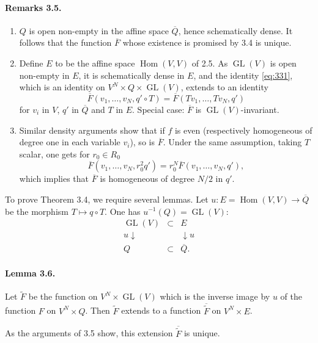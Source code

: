 \documentclass[11pt]{article}
\newcommand{\Hom}{\operatorname{Hom}}
\newcommand{\GL}{\operatorname{GL}}
\newcommand{\barQ}{\overline Q}
\begin{document}
\paragraph{Remarks 3.5.}
\begin{enumerate}[label=(\roman*)]
\item $Q$ is open non-empty in the affine space $\barQ$, hence schematically dense. It follows that the function $\overline F$ whose existence is promised by 3.4 is unique.
\item Define $E$ to be the affine space $\Hom(V,V)$ of 2.5. As $\GL(V)$ is open non-empty in $E$, it is schematically dense in $E$, and the identity \eqref{eq:331}, which is an identity on $V^N\times Q\times\GL(V)$, extends to an identity
\begin{equation}
\label{eq:351}
\overline F(v_1,\ldots,v_N,q'\circ T)=\overline F(Tv_1,\ldots,Tv_N,q')
\end{equation}
for $v_i$ in $V$, $q'$ in $\barQ$ and $T$ in $E$. Special case: $\overline F$ is $\GL(V)$-invariant.
\item Similar density arguments show that if $f$ is even (respectively homogeneous of degree one in each variable $v_i$), so is $\overline F$. Under the same assumption, taking $T$ scalar, one gets for $r_0\in R_0$
\[
\overline F(v_1,\ldots,v_N,r_0^2q')=r_0^N\overline F(v_1,\ldots,v_N,q'),
\]
which implies that $\overline F$ is homogeneous of degree $N/2$ in $q'$.
\end{enumerate}

To prove Theorem 3.4, we require several lemmas. Let $u:E=\Hom(V,V)\to\barQ$ be the morphism $T\mapsto q\circ T$. One has $u^{-1}(Q)=\GL(V)$:
\begin{equation}
\label{eq:352}
\begin{array}{ccc}
\GL(V)&\subset&E\\
\scriptstyle u\downarrow&&\downarrow\scriptstyle u\\
Q&\subset&\barQ.
\end{array}
\end{equation}

\paragraph{Lemma 3.6.}
Let $\widetilde F$ be the function on $V^N\times\GL(V)$ which is the inverse image by $u$ of the function $F$ on $V^N\times Q$. Then $\widetilde F$ extends to a function $\overline{\widetilde F}$ on $V^N\times E$.

As the arguments of 3.5 show, this extension $\overline{\widetilde F}$ is unique.
\end{document}
